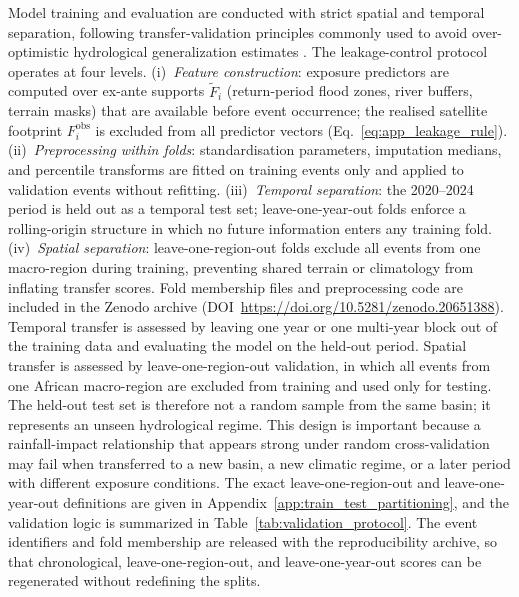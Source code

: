 \documentclass[pdflatex,sn-mathphys-ay]{sn-jnl}
\theoremstyle{thmstyleone}
\begin{document}
Model training and evaluation are conducted with strict spatial and
temporal separation, following transfer-validation principles commonly
used to avoid over-optimistic hydrological generalization estimates
\citep{Kauffeldt2016,Kratzert2019,Nearing2024}.
The leakage-control protocol operates at four levels.
(i)~\emph{Feature construction}: exposure predictors are computed over
ex-ante supports $\widetilde{F}_i$ (return-period flood zones, river
buffers, terrain masks) that are available before event occurrence;
the realised satellite footprint $F^{\mathrm{obs}}_i$ is excluded from
all predictor vectors (Eq.~\eqref{eq:app_leakage_rule}).
(ii)~\emph{Preprocessing within folds}: standardisation parameters,
imputation medians, and percentile transforms are fitted on training
events only and applied to validation events without refitting.
(iii)~\emph{Temporal separation}: the 2020--2024 period is held out as
a temporal test set; leave-one-year-out folds enforce a rolling-origin
structure in which no future information enters any training fold.
(iv)~\emph{Spatial separation}: leave-one-region-out folds exclude all
events from one macro-region during training, preventing shared
terrain or climatology from inflating transfer scores.
Fold membership files and preprocessing code are included in the Zenodo
archive (DOI~\url{https://doi.org/10.5281/zenodo.20651388}).
Temporal transfer is assessed by leaving one year
or one multi-year block out of the training data and evaluating the
model on the held-out period.  Spatial transfer is assessed by
leave-one-region-out validation, in which all events from one African
macro-region are excluded from training and used only for testing.  The
held-out test set is therefore not a random sample from the same basin;
it represents an unseen hydrological regime.  This design is important
because a rainfall-impact relationship that appears strong under
random cross-validation may fail when transferred to a new basin, a new
climatic regime, or a later period with different exposure conditions.
The exact leave-one-region-out and leave-one-year-out definitions are
given in Appendix~\ref{app:train_test_partitioning}, and the validation
logic is summarized in Table~\ref{tab:validation_protocol}.  The event
identifiers and fold membership are released with the reproducibility
archive, so that chronological, leave-one-region-out, and
leave-one-year-out scores can be regenerated without redefining the
splits.
\end{document}
